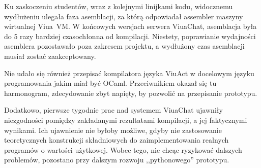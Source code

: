 Ku zaskoczeniu studentów, wraz z kolejnymi linijkami kodu, widocznemu wydłużeniu
ulegała faza asemblacji, za którą odpowiadał assembler maszyny wirtualnej
Viua~VM. W końcowych wersjach serwera ViuaChat, asemblacja była do 5 razy
bardziej czasochłonna od kompilacji. Niestety, poprawianie wydajności asemblera
pozostawało poza zakresem projektu, a wydłużony czas asemblacji musiał zostać
zaakceptowany.

Nie udało się również przepisać kompilatora języka ViuAct w docelowym języku
programowania jakim miał być OCaml. Przeciwnikiem okazał się tu harmonogram,
zdecydowanie zbyt napięty, by pozwolić na przepisanie prototypu.

Dodatkowo, pierwsze tygodnie prac nad systemem ViuaChat ujawniły niezgodności
pomiędzy zakładanymi rezultatami kompilacji, a jej faktycznymi wynikami. Ich
ujawnienie nie byłoby możliwe, gdyby nie zastosowanie teoretycznych konstrukcji
składniowych do zaimplementowania realnych programów o wartości użytkowej.
Wobec tego, nie chcąc ryzykować dalszych problemów, pozostano przy dalszym
rozwoju ,,pythonowego'' prototypu.
